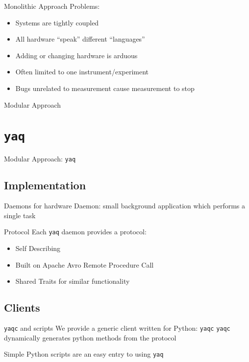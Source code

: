 \documentclass{presentation}
\begin{document}
\begin{frame}{Monolithic Approach}
	Problems:
	\begin{itemize}
		\item Systems are tightly coupled
		\item All hardware ``speak'' different ``languages''
		\item Adding or changing hardware is arduous
		\item Often limited to one instrument/experiment
		\item Bugs unrelated to measurement cause measurement to stop
	\end{itemize}
\end{frame}


\begin{frame}{Modular Approach}
\end{frame}

\section{\texttt{yaq}}

\begin{frame}{Modular Approach: \texttt{yaq}}
\end{frame}

\subsection{Implementation}
\begin{frame}{Daemons for hardware}
	Daemon: small background application which performs a single task
\end{frame}
\begin{frame}{Protocol}
	Each \texttt{yaq} daemon provides a protocol:
	\begin{itemize}
		\item Self Describing
		\item Built on Apache Avro Remote Procedure Call
		\item Shared Traits for similar functionality
	\end{itemize}
\end{frame}
\subsection{Clients}
\begin{frame}{\texttt{yaqc} and scripts}
	We provide a generic client written for Python: \texttt{yaqc}
\vfill
	\texttt{yaqc} dynamically generates python methods from the protocol

\vfill
	Simple Python scripts are an easy entry to using \texttt{yaq}

\end{frame}
\end{document}

